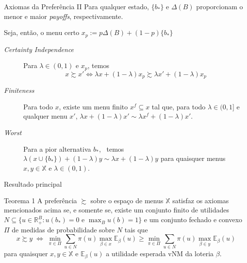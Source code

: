 \documentclass[11pt]{beamer}
\theoremstyle{nonumberplain}
\theoremstyle{plain}
\begin{document}
\begin{frame}{Axiomas da Preferência II}
Para qualquer estado, $\{b_*\}$ e $\Delta(B)$ proporcionam o menor e maior \emph{payoffs}, respectivamente.
 
\vspace{10pt}

Seja, então, o menu certo $x_p:=p\Delta(B)+(1-p)\{b_*\}$

\vspace{10pt}

\begin{description}
\item [\textit{Certainty Independence}] Para $\lambda\in (0,1)$ e $x_p$, temos $$x\succsim x' \Leftrightarrow \lambda x +(1-\lambda)x_p\succsim \lambda x' + (1-\lambda)x_p$$
\end{description}
\pause
\begin{description}
\item[\textit{Finiteness}] Para todo $x$, existe um menu finito $x^f\subseteq x$ tal que, para todo $\lambda\in (0,1]$ e qualquer menu $x'$, $\lambda x +(1-\lambda)x' \sim \lambda x^f +(1-\lambda)x'$.
\item[\textit{Worst}] Para a pior alternativa $b_*$, ~temos $\lambda\left(x\cup \{b_*\}\right)+(1-\lambda)y\sim \lambda x + (1-\lambda)y$ para quaisquer menus $x,y\in \mathbb{X}$ e $\lambda\in (0,1)$.
\end{description}

\end{frame}

\begin{frame}{Resultado principal}
\begin{block}{Teorema 1}
A preferência $\succsim$ sobre o espaço de menus $\mathbb{X}$ satisfaz os axiomas mencionados acima se, e somente se, existe um conjunto finito de utilidades $N\subseteq \{u \in \mathbb{R}^B_+:u(b_*)=0\text { e }\max_{B}u(b)=1\}$ e um conjunto fechado e convexo $\Pi$ de medidas de probabilidade sobre $N$ tais que 
\[x \succsim y \;\Leftrightarrow\; \min_{\pi\in\Pi}\sum_{u\in N} \pi(u)\max_{\beta\in x}\mathbb{E}_\beta(u)\geq \min_{\pi\in\Pi}\sum_{u\in N} \pi(u)\max_{\beta\in y}\mathbb{E}_\beta(u)\]
para quaisquer $x,y\in\mathbb{X}$ e $\mathbb{E}_\beta(u)$ a utilidade esperada vNM
da loteria $\beta$. 
\end{block} 
\end{frame}
\end{document}
